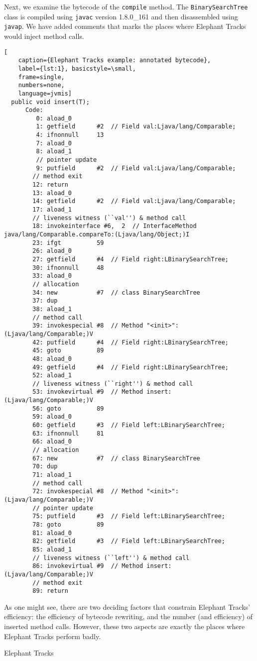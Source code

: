 Next, we examine the bytecode of the \lstinline{compile} method. The \lstinline{BinarySearchTree} class
is compiled using \lstinline{javac} version 1.8.0\_161 and then disassembled using \lstinline{javap}. We have
added comments that marks the places where Elephant Tracks would inject method calls.
\begin{lstlisting}[
    caption={Elephant Tracks example: annotated bytecode},
    label={lst:1}, basicstyle=\small,
    frame=single,
    numbers=none,
    language=jvmis]
  public void insert(T);
      Code:
         0: aload_0
         1: getfield      #2  // Field val:Ljava/lang/Comparable;
         4: ifnonnull     13
         7: aload_0
         8: aload_1
         // pointer update
         9: putfield      #2  // Field val:Ljava/lang/Comparable;
        // method exit
        12: return
        13: aload_0
        14: getfield      #2  // Field val:Ljava/lang/Comparable;
        17: aload_1
        // liveness witness (``val'') & method call
        18: invokeinterface #6,  2  // InterfaceMethod java/lang/Comparable.compareTo:(Ljava/lang/Object;)I
        23: ifgt          59
        26: aload_0
        27: getfield      #4  // Field right:LBinarySearchTree;
        30: ifnonnull     48
        33: aload_0
        // allocation
        34: new           #7  // class BinarySearchTree
        37: dup
        38: aload_1
        // method call
        39: invokespecial #8  // Method "<init>":(Ljava/lang/Comparable;)V
        42: putfield      #4  // Field right:LBinarySearchTree;
        45: goto          89
        48: aload_0
        49: getfield      #4  // Field right:LBinarySearchTree;
        52: aload_1
        // liveness witness (``right'') & method call
        53: invokevirtual #9  // Method insert:(Ljava/lang/Comparable;)V
        56: goto          89
        59: aload_0
        60: getfield      #3  // Field left:LBinarySearchTree;
        63: ifnonnull     81
        66: aload_0
        // allocation
        67: new           #7  // class BinarySearchTree
        70: dup
        71: aload_1
        // method call
        72: invokespecial #8  // Method "<init>":(Ljava/lang/Comparable;)V
        // pointer update
        75: putfield      #3  // Field left:LBinarySearchTree;
        78: goto          89
        81: aload_0
        82: getfield      #3  // Field left:LBinarySearchTree;
        85: aload_1
        // liveness witness (``left'') & method call
        86: invokevirtual #9  // Method insert:(Ljava/lang/Comparable;)V
        // method exit
        89: return
\end{lstlisting}

As one might see, there are two deciding factors that constrain Elephant Tracks' efficiency: the efficiency
of bytecode rewriting, and the number (and efficiency) of inserted method calls. However, these two aspects are exactly
the places where Elephant Tracks perform badly.

Elephant Tracks 

